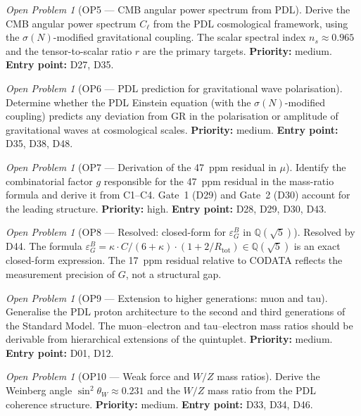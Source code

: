 \documentclass[11pt,a4paper]{article}
\theoremstyle{plain}
\theoremstyle{definition}
\theoremstyle{remark}
\newtheorem{openproblem}[theorem]{Open Problem}
\newcommand{\Rtot}{R_{\mathrm{tot}}}
\newcommand{\sigmaN}{\sigma(N)}
\newcommand{\epsGeomB}{\varepsilon_G^B}
\begin{document}
\begin{openproblem}[OP5 --- CMB angular power spectrum from PDL]
\label{op:CMBspectrum}
Derive the CMB angular power spectrum $C_\ell$ from the PDL cosmological framework, using the $\sigmaN$-modified gravitational coupling. The scalar spectral index $n_s \approx 0.965$ and the tensor-to-scalar ratio $r$ are the primary targets. \textbf{Priority:} medium. \textbf{Entry point:} D27, D35.
\end{openproblem}

\begin{openproblem}[OP6 --- PDL prediction for gravitational wave polarisation]
\label{op:GW}
Determine whether the PDL Einstein equation (with the $\sigmaN$-modified coupling) predicts any deviation from GR in the polarisation or amplitude of gravitational waves at cosmological scales. \textbf{Priority:} medium. \textbf{Entry point:} D35, D38, D48.
\end{openproblem}

\begin{openproblem}[OP7 --- Derivation of the 47~ppm residual in $\mu$]
\label{op:residual}
Identify the combinatorial factor $g$ responsible for the 47~ppm residual in the mass-ratio formula and derive it from C1--C4. Gate~1 (D29) and Gate~2 (D30) account for the leading structure. \textbf{Priority:} high. \textbf{Entry point:} D28, D29, D30, D43.
\end{openproblem}

\begin{openproblem}[OP8 --- Resolved: closed-form for $\epsGeomB$ in $\mathbb{Q}(\sqrt{5})$]
\label{op:epsGeomB}
\textcolor{proofblue}{Resolved by D44.} The formula $\epsGeomB = \kappa \cdot C/(6+\kappa)\cdot(1+2/\Rtot) \in \mathbb{Q}(\sqrt{5})$ is an exact closed-form expression. The 17~ppm residual relative to CODATA reflects the measurement precision of $G$, not a structural gap.
\end{openproblem}

\begin{openproblem}[OP9 --- Extension to higher generations: muon and tau]
\label{op:generations}
Generalise the PDL proton architecture to the second and third generations of the Standard Model. The muon--electron and tau--electron mass ratios should be derivable from hierarchical extensions of the quintuplet. \textbf{Priority:} medium. \textbf{Entry point:} D01, D12.
\end{openproblem}

\begin{openproblem}[OP10 --- Weak force and $W/Z$ mass ratios]
\label{op:weak}
Derive the Weinberg angle $\sin^2\theta_W\approx 0.231$ and the $W/Z$ mass ratio from the PDL coherence structure. \textbf{Priority:} medium. \textbf{Entry point:} D33, D34, D46.
\end{openproblem}
\end{document}
